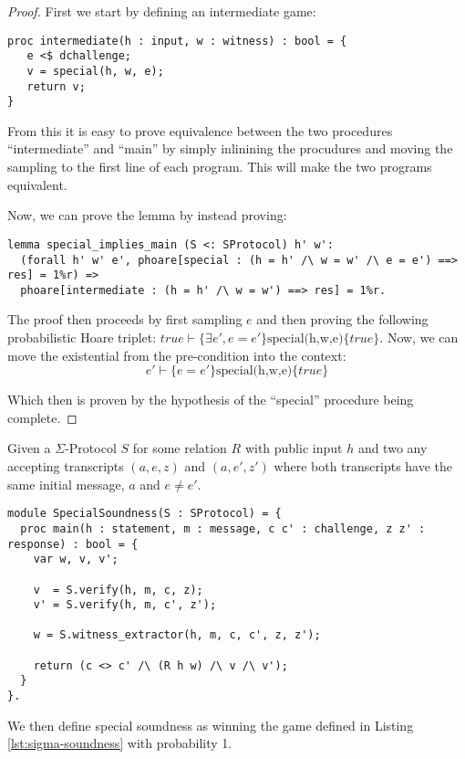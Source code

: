 \begin{proof}
First we start by defining an intermediate game:
\begin{lstlisting}
proc intermediate(h : input, w : witness) : bool = {
   e <$ dchallenge;
   v = special(h, w, e);
   return v;
}
\end{lstlisting}

From this it is easy to prove equivalence between the two procedures
``intermediate'' and ``main'' by simply inlinining the procudures and moving
the sampling to the first line of each program. This will make the two programs
equivalent.

Now, we can prove the lemma by instead proving:
\begin{lstlisting}
lemma special_implies_main (S <: SProtocol) h' w':
  (forall h' w' e', phoare[special : (h = h' /\ w = w' /\ e = e') ==> res] = 1%r) =>
  phoare[intermediate : (h = h' /\ w = w') ==> res] = 1%r.
\end{lstlisting}

The proof then proceeds by first sampling $e$ and then proving the following
probabilistic Hoare triplet: $true \vdash \{\exists e', e = e'\}
\text{special(h,w,e)} \{true\}$. Now, we can move the existential
from the pre-condition into the context:
\[
  e' \vdash \{e = e'\} \text{special(h,w,e)} \{true\}
\]

Which then is proven by the hypothesis of the ``special'' procedure being complete.

\end{proof}


\begin{definition}
\label{def:sigma:soundness}
Given a $\Sigma$-Protocol $S$ for some relation $R$ with public input $h$
and two any accepting transcripts $(a,e,z)$ and $(a,e',z')$
where both transcripts have the same initial message, $a$ and $e \neq e'$.

\begin{lstlisting}[float, label=lst:sigma-soundness, caption= 2-special soundness game]
module SpecialSoundness(S : SProtocol) = {
  proc main(h : statement, m : message, c c' : challenge, z z' : response) : bool = {
    var w, v, v';

    v  = S.verify(h, m, c, z);
    v' = S.verify(h, m, c', z');

    w = S.witness_extractor(h, m, c, c', z, z');

    return (c <> c' /\ (R h w) /\ v /\ v');
  }
}.
\end{lstlisting}

We then define special soundness as winning the game
defined in Listing \ref{lst:sigma-soundness} with probability 1.

\end{definition}

